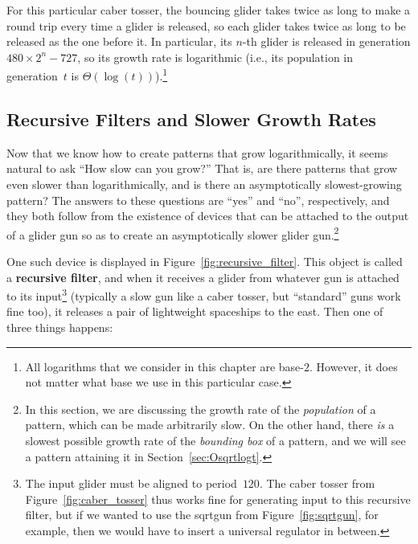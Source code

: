 For this particular caber tosser, the bouncing glider takes twice as long to make a round trip every time a glider is released, so each glider takes twice as long to be released as the one before it. In particular, its $n$-th glider is released in generation $480 \times 2^n - 727$, so its growth rate is logarithmic (i.e., its population in generation~$t$ is $\Theta(\log(t))$).\footnote{All logarithms that we consider in this chapter are base-$2$. However, it does not matter what base we use in this particular case.}


\subsection{Recursive Filters and Slower Growth Rates}\label{sec:recursive_filter}

Now that we know how to create patterns that grow logarithmically, it seems natural to ask ``How slow can you grow?'' That is, are there patterns that grow even slower than logarithmically, and is there an asymptotically slowest-growing pattern? The answers to these questions are ``yes'' and ``no'', respectively, and they both follow from the existence of devices that can be attached to the output of a glider gun so as to create an asymptotically slower glider gun.\footnote{In this section, we are discussing the growth rate of the \emph{population} of a pattern, which can be made arbitrarily slow. On the other hand, there \emph{is} a slowest possible growth rate of the \emph{bounding box} of a pattern, and we will see a pattern attaining it in Section~\ref{sec:Osqrtlogt}.}

One such device is displayed in Figure~\ref{fig:recursive_filter}. This object is called a \textbf{recursive filter}, and when it receives a glider from whatever gun is attached to its input\footnote{The input glider must be aligned to period~$120$. The caber tosser from Figure~\ref{fig:caber_tosser} thus works fine for generating input to this recursive filter, but if we wanted to use the sqrtgun from Figure~\ref{fig:sqrtgun}, for example, then we would have to insert a universal regulator in between.} (typically a slow gun like a caber tosser, but ``standard'' guns work fine too), it releases a pair of lightweight spaceships to the east. Then one of three things happens:\smallskip

